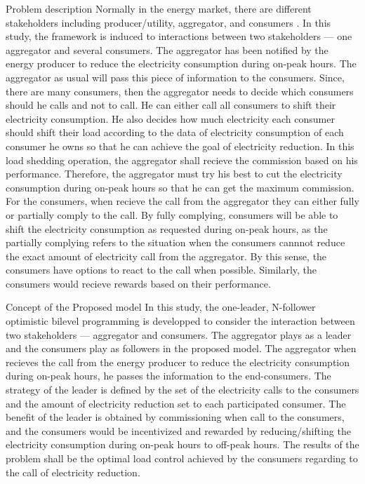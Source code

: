 \documentclass{article}
\begin{document}
{\red Problem description} Normally in the energy market, there are different stakeholders including producer/utility, aggregator, and consumers \cite{ALAMOUSH2024114074}.
In this study, the framework is induced to interactions between two stakeholders --- one aggregator and several consumers.
The aggregator has been notified by the energy producer to reduce the electricity consumption during on-peak hours.
The aggregator as usual will pass this piece of information to the consumers.
Since, there are many consumers, then the aggregator needs to decide which consumers should he calls and not to call.
He can either call all consumers to shift their electricity consumption.
He also decides how much electricity each consumer should shift their load according to the data of electricity consumption of each consumer he owns so that he can achieve the goal of electricity reduction.
In this load shedding operation, the aggregator shall recieve the commission based on his performance.
Therefore, the aggregator must try his best to cut the electricity consumption during on-peak hours so that he can get the maximum commission.
For the consumers, when recieve the call from the aggregator they can either fully or partially comply to the call.
By fully complying, consumers will be able to shift the electricity consumption as requested during on-peak hours, as the partially complying refers to the situation when the consumers cannnot reduce the exact amount of electricity call from the aggregator.
By this sense, the consumers have options to react to the call when possible.
Similarly, the consumers would recieve rewards based on their performance.

{\red Concept of the Proposed model}
In this study, the one-leader, N-follower optimistic bilevel programming is developped to consider the interaction between two stakeholders --- aggregator and consumers.
The aggregator plays as a leader and the consumers play as followers in the proposed model.
The aggregator when recieves the call from the energy producer to reduce the electricity consumption during on-peak hours, he passes the information to the end-consumers.
The strategy of the leader is defined by the set of the electricity calls to the consumers and the amount of electricity reduction set to each participated consumer.
The benefit of the leader is obtained by commissioning when call to the consumers, and the consumers would be incentivized and rewarded by reducing/shifting the electricity consumption during on-peak hours to off-peak hours.
The results of the problem shall be the optimal load control achieved by the consumers regarding to the call of electricity reduction.
\end{document}

